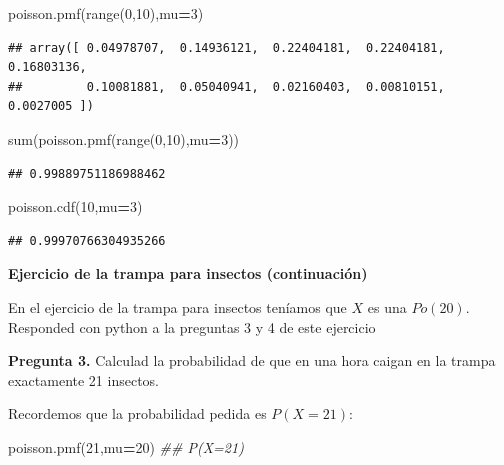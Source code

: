 \documentclass[]{book}
\newenvironment{Shaded}{\begin{snugshade}}{\end{snugshade}}
\newcommand{\BuiltInTok}[1]{#1}
\newcommand{\CommentTok}[1]{\textcolor[rgb]{0.56,0.35,0.01}{\textit{#1}}}
\newcommand{\DecValTok}[1]{\textcolor[rgb]{0.00,0.00,0.81}{#1}}
\newcommand{\NormalTok}[1]{#1}
\newcommand{\OperatorTok}[1]{\textcolor[rgb]{0.81,0.36,0.00}{\textbf{#1}}}
\begin{document}
\begin{Shaded}
\begin{Highlighting}[]
\NormalTok{poisson.pmf(}\BuiltInTok{range}\NormalTok{(}\DecValTok{0}\NormalTok{,}\DecValTok{10}\NormalTok{),mu}\OperatorTok{=}\DecValTok{3}\NormalTok{)}
\end{Highlighting}
\end{Shaded}

\begin{verbatim}
## array([ 0.04978707,  0.14936121,  0.22404181,  0.22404181,  0.16803136,
##         0.10081881,  0.05040941,  0.02160403,  0.00810151,  0.0027005 ])
\end{verbatim}

\begin{Shaded}
\begin{Highlighting}[]
\BuiltInTok{sum}\NormalTok{(poisson.pmf(}\BuiltInTok{range}\NormalTok{(}\DecValTok{0}\NormalTok{,}\DecValTok{10}\NormalTok{),mu}\OperatorTok{=}\DecValTok{3}\NormalTok{))}
\end{Highlighting}
\end{Shaded}

\begin{verbatim}
## 0.99889751186988462
\end{verbatim}

\begin{Shaded}
\begin{Highlighting}[]
\NormalTok{poisson.cdf(}\DecValTok{10}\NormalTok{,mu}\OperatorTok{=}\DecValTok{3}\NormalTok{)}
\end{Highlighting}
\end{Shaded}

\begin{verbatim}
## 0.99970766304935266
\end{verbatim}

\textbf{Ejercicio de la trampa para insectos (continuación)}

En el ejercicio de la trampa para insectos teníamos que \(X\) es una \(Po(20)\). Responded con python a la preguntas 3 y 4 de este ejercicio

\textbf{Pregunta 3.} Calculad la probabilidad de que en una hora caigan en la trampa exactamente 21 insectos.

Recordemos que la probabilidad pedida es \(P(X=21)\):

\begin{Shaded}
\begin{Highlighting}[]
\NormalTok{poisson.pmf(}\DecValTok{21}\NormalTok{,mu}\OperatorTok{=}\DecValTok{20}\NormalTok{)}
\CommentTok{## P(X=21)}
\end{Highlighting}
\end{Shaded}
\end{document}
